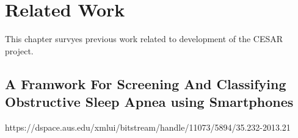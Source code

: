 \chapter{Related Work}
This chapter survyes previous work related to development of the CESAR project. 



\section{A Framwork For Screening And Classifying Obstructive Sleep Apnea using Smartphones}
https://dspace.aus.edu/xmlui/bitstream/handle/11073/5894/35.232-2013.21%